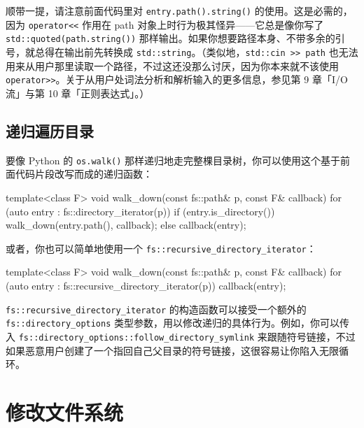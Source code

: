 顺带一提，请注意前面代码里对 \texttt{entry.\allowbreak{}path(\allowbreak{})\allowbreak{}.string(\allowbreak{})\allowbreak{}} 的使用。这是必需的，因为 \texttt{operator<<} 作用在 path 对象上时行为极其怪异——它总是像你写了 \texttt{std::\allowbreak{}quoted(\allowbreak{}path.\allowbreak{}string(\allowbreak{})\allowbreak{})\allowbreak{}} 那样输出。如果你想要路径本身、不带多余的引号，就总得在输出前先转换成 \texttt{std::\allowbreak{}string}。（类似地，\texttt{std::\allowbreak{}cin >> path} 也无法用来从用户那里读取一个路径，不过这还没那么讨厌，因为你本来就不该使用 \texttt{operator>\allowbreak{}>}。关于从用户处词法分析和解析输入的更多信息，参见第 9 章「I/O 流」与第 10 章「正则表达式」。）

\subsection{递归遍历目录}

要像 Python 的 \texttt{os.\allowbreak{}walk(\allowbreak{})\allowbreak{}} 那样递归地走完整棵目录树，你可以使用这个基于前面代码片段改写而成的递归函数：

\begin{codebox}[cpp]
    template<class F>
    void walk_down(const fs::path& p, const F& callback)
    {
      for (auto entry : fs::directory_iterator(p)) {
        if (entry.is_directory()) {
          walk_down(entry.path(), callback);
        } else {
          callback(entry);
        }
      }
    }
\end{codebox}

或者，你也可以简单地使用一个 \texttt{fs::\allowbreak{}recursive\_\allowbreak{}directory\_\allowbreak{}iterator}：

\begin{codebox}[cpp]
    template<class F>
    void walk_down(const fs::path& p, const F& callback)
    {
      for (auto entry : fs::recursive_directory_iterator(p)) {
        callback(entry);
      }
    }
\end{codebox}

\texttt{fs::\allowbreak{}recursive\_\allowbreak{}directory\_\allowbreak{}iterator} 的构造函数可以接受一个额外的 \texttt{fs::\allowbreak{}directory\_\allowbreak{}options} 类型参数，用以修改递归的具体行为。例如，你可以传入 \texttt{fs::\allowbreak{}directory\_\allowbreak{}options::\allowbreak{}follow\_\allowbreak{}directory\_\allowbreak{}symlink} 来跟随符号链接，不过如果恶意用户创建了一个指回自己父目录的符号链接，这很容易让你陷入无限循环。

\section{修改文件系统}

